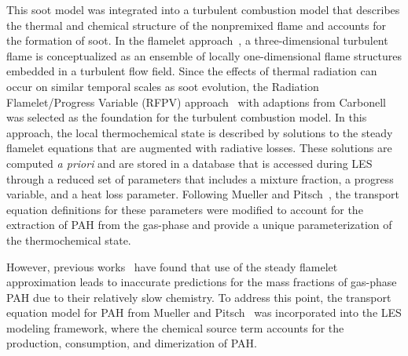 This soot model was integrated into a turbulent combustion model that describes the thermal and chemical structure of the nonpremixed flame and accounts for the formation of soot. In the flamelet approach~\cite{peters1984}, a three-dimensional turbulent flame is conceptualized as an ensemble of locally one-dimensional flame structures embedded in a turbulent flow field. Since the effects of thermal radiation can occur on similar temporal scales as soot evolution, the Radiation Flamelet/Progress Variable (RFPV) approach~\cite{ihme2008} with adaptions from Carbonell \etal~\cite{carbonell2009} was selected as the foundation for the turbulent combustion model. In this approach, the local thermochemical state is described by solutions to the steady flamelet equations that are augmented with radiative losses. These solutions are computed \textit{a priori} and are stored in a database that is accessed during LES through a reduced set of parameters that includes a mixture fraction, a progress variable, and a heat loss parameter. Following Mueller and Pitsch~\cite{mueller2012}, the transport equation definitions for these parameters were modified to account for the extraction of PAH from the gas-phase and provide a unique parameterization of the thermochemical state.

However, previous works~\cite{attili2014,bisetti2012} have found that use of the steady flamelet approximation leads to inaccurate predictions for the mass fractions of gas-phase PAH due to their relatively slow chemistry. To address this point, the transport equation model for PAH from Mueller and Pitsch~\cite{mueller2012} was incorporated into the LES modeling framework, where the chemical source term accounts for the production, consumption, and dimerization of PAH.

